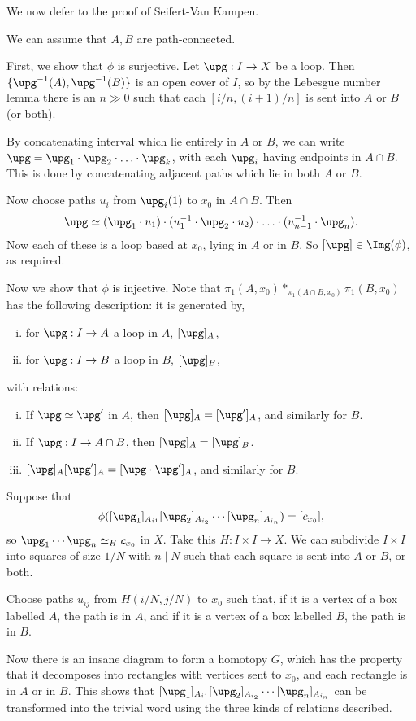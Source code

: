 \documentclass[12pt]{article}
\begin{document}
We now defer to the proof of Seifert-Van Kampen.

\begin{proofbox}
	We can assume that $A, B$ are path-connected.

	First, we show that $\phi$ is surjective. Let $\upg : I \to X$ be a loop. Then $\{\upg^{-1}(A), \upg^{-1}(B)\}$ is an open cover of $I$, so by the Lebesgue number lemma there is an $n \gg 0$ such that each $[i/n, (i+1)/n]$ is sent into $A$ or $B$ (or both).

	By concatenating interval which lie entirely in $A$ or $B$, we can write $\upg = \upg_1 \cdot \upg_2 \cdot \ldots \cdot \upg_k$, with each $\upg_i$ having endpoints in $A \cap B$. This is done by concatenating adjacent paths which lie in both $A$ or $B$.

	Now choose paths $u_i$ from $\upg_i(1)$ to $x_0$ in $A \cap B$. Then
	\[
	\upg \simeq (\upg_1 \cdot u_1) \cdot (u_1^{-1} \cdot \upg_2 \cdot u_2) \cdot \ldots \cdot (u_{n-1}^{-1} \cdot \upg_n).
	\]
	Now each of these is a loop based at $x_0$, lying in $A$ or in $B$. So $[\upg] \in \Img(\phi)$, as required.

	Now we show that $\phi$ is injective. Note that $\pi_1(A, x_0) \ast_{\pi_1(A \cap B, x_0)} \pi_1(B, x_0)$ has the following description: it is generated by,
	\begin{enumerate}[(i)]
		\item for $\upg : I \to A$ a loop in $A$, $[\upg]_A$,
		\item for $\upg : I \to B$ a loop in $B$, $[\upg]_B$,
	\end{enumerate}
	with relations:
	\begin{enumerate}[(i)]
		\item If $\upg \simeq \upg'$ in $A$, then $[\upg]_A = [\upg']_A$, and similarly for $B$.
		\item If $\upg : I \to A \cap B$, then $[\upg]_A = [\upg]_B$.
		\item $[\upg]_A [\upg']_A = [\upg \cdot \upg']_A$, and similarly for $B$.
	\end{enumerate}
	Suppose that
	\[
		\phi([\upg_1]_{A_{i1}} [\upg_2]_{A_{i_2}} \cdots [\upg_n]_{A_{i_n}}) = [c_{x_0}],
	\]
	so $\upg_1 \cdots \upg_n \simeq_H c_{x_0}$ in $X$. Take this $H : I \times I \to X$. We can subdivide $I \times I$ into squares of size $1/N$ with $n \mid N$ such that each square is sent into $A$ or $B$, or both.

	Choose paths $u_{ij}$ from $H(i/N, j/N)$ to $x_0$ such that, if it is a vertex of a box labelled $A$, the path is in $A$, and if it is a vertex of a box labelled $B$, the path is in $B$.

	Now there is an insane diagram to form a homotopy $G$, which has the property that it decomposes into rectangles with vertices sent to $x_0$, and each rectangle is in $A$ or in $B$. This shows that $[\upg_1]_{A_{i1}} [\upg_2]_{A_{i_2}} \cdots [\upg_n]_{A_{i_n}}$ can be transformed into the trivial word using the three kinds of relations described.
\end{proofbox}
\end{document}
